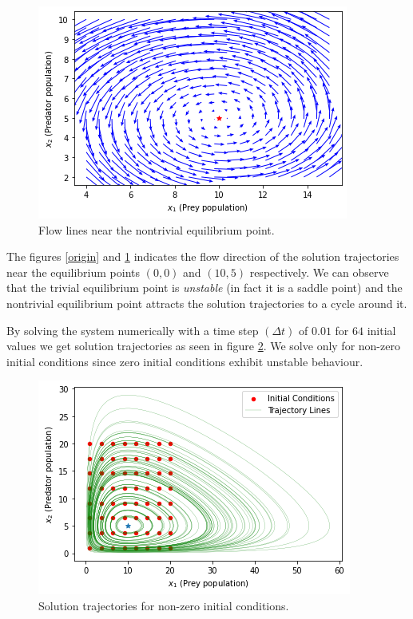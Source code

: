 \documentclass{article}
\begin{document}
\begin{figure}[h]
\centering
\includegraphics[scale=0.75]{images/nontrivial.png}
\caption{Flow lines near the nontrivial equilibrium point.}
\label{nontr}
\end{figure}

The figures \ref{origin} and \ref{nontr} indicates the flow direction of the solution trajectories near the equilibrium points $(0,0)$ and $(10,5)$ respectively. We can observe that the trivial equilibrium point is \emph{unstable} (in fact it is a saddle point) and the nontrivial equilibrium point attracts the solution trajectories to a cycle around it. 

By solving the system numerically with a time step $(\Delta t)$ of $0.01$ for $64$ initial values we get solution trajectories as seen in figure \ref{traj}. We solve only for non-zero initial conditions since zero initial conditions exhibit unstable behaviour. 

\begin{figure}[h]
\centering
\includegraphics[scale=0.75]{images/init.png}
\caption{Solution trajectories for non-zero initial conditions.}
\label{traj}
\end{figure}
\end{document}
